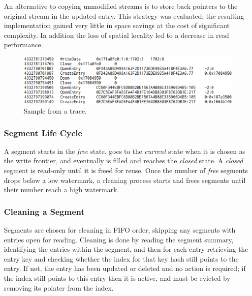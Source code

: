 \documentclass[letterpaper,twocolumn,10pt]{article}
\begin{document}
An alternative to copying unmodified streams is to store back pointers to the
original stream in the updated entry. This strategy was evaluated; the resulting
implementation gained very little in space savings at the cost of significant
complexity. In addition the loss of spatial locality led to a decrease in read
performance.

\begin{figure}
  \begin{center}
    \includegraphics[width=\columnwidth]{graphs/trace}
  \end{center}
  \caption{Sample from a trace.}
  \label{fig:trace}
\vspace{-0.2in}
\end{figure}

\subsubsection{Segment Life Cycle}
A segment starts in the \emph{free} state, goes to the \emph{current} state when
it is chosen as the write frontier, and eventually is filled and reaches the
\emph{closed} state.  A \emph{closed} segment is read-only until it is freed for
reuse.  Once the number of \emph{free} segments drops below a low watermark, a
cleaning process starts and frees segments until their number reach a high
watermark.

\subsubsection{Cleaning a Segment}
Segments are chosen for cleaning in FIFO order, skipping any segments with
entries open for reading. Cleaning is done by reading the segment summary,
identifying the entries within the segment, and then for each entry retrieving
the entry key and checking whether the index for that key hash still points to
the entry. If not, the entry has been updated or deleted and no action is
required; if the index still points to this entry then it is active, and must be
evicted by removing its pointer from the index.
\end{document}
